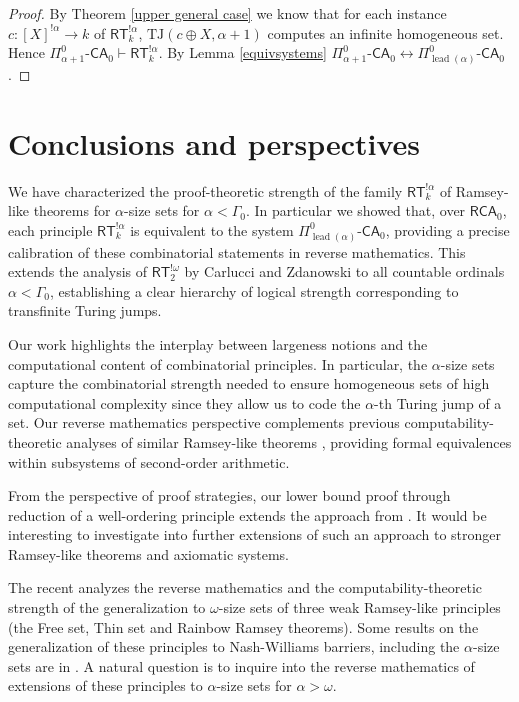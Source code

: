 \documentclass[11pt]{amsart}
\theoremstyle{definition}
\theoremstyle{remark}
\theoremstyle{plain}
\def\a{\alpha}
\newcommand{\RCA}{\mathsf{RCA}_0}
\newcommand{\RT}{\mathsf{RT}}
\newcommand{\TJ}{\mathsf{TJ}}
\newcommand{\lead}{\operatorname{lead}}
\newcommand{\CA}{\mathsf{\text{-}CA}_0}
\def\TJ{{\textrm{TJ}}}
\newcommand{\andrea}[1]{\textcolor{green}{#1}}
\begin{document}
\begin{proof}
By Theorem \ref{upper general case} we know that for each instance $c \colon [X]^{! \alpha} \to k$ of $\RT^{! \alpha}_k$, $\TJ(c \oplus X, \a+1)$ computes an infinite homogeneous set.
Hence $\Pi^0_{\alpha + 1} \CA \vdash \RT^{! \alpha}_k$.
By Lemma \ref{equivsystems} $\Pi^0_{\alpha + 1} \CA \leftrightarrow \Pi^0_{\lead(\alpha)} \CA$.
\end{proof}




\section{Conclusions and perspectives}


We have characterized the proof-theoretic strength of the family $\RT^{!\alpha}_k$ of Ramsey-like theorems for $\alpha$-size sets for $\alpha < \Gamma_0$. 
In particular we showed that, over $\RCA$, each principle $\RT^{!\alpha}_k$ is equivalent to the system $\Pi^0_{\lead(\alpha)} \CA$, providing a precise calibration of these combinatorial statements in reverse mathematics. 
This extends the analysis of $\RT^{!\omega}_2$ by Carlucci and Zdanowski \cite{carlucci2014} to all countable ordinals $\alpha<\Gamma_0$, establishing a clear hierarchy of logical strength corresponding to transfinite Turing jumps.

Our work highlights the interplay between largeness notions and the computational content of combinatorial principles. 
In particular, the $\alpha$-size sets capture the combinatorial strength needed to ensure homogeneous sets of high computational complexity since they allow us to code the $\alpha$-th Turing jump of a set.
Our reverse mathematics perspective complements previous computability-theoretic analyses of similar Ramsey-like theorems \cite{clote1984recursion}, providing formal equivalences within subsystems of second-order arithmetic.

From the perspective of proof strategies, our lower bound proof through reduction of a well-ordering principle extends the approach from \cite{carlucci_zdanowski_2012, carlucci2025}. 
It would be interesting to investigate into further extensions of such an approach to stronger Ramsey-like theorems and axiomatic systems. 

\begin{sloppypar}
The recent \cite{carlucci2024} analyzes the reverse mathematics and the computability-theoretic strength of the generalization to $\omega$-size sets of three weak Ramsey-like principles (the Free set, Thin set and Rainbow Ramsey theorems). 
Some results on the generalization of these principles to Nash-Williams barriers, including the $\alpha$-size sets are in \cite{carlucci_gjetaj_26}. A natural question is to inquire into the reverse mathematics of extensions of these principles to $\a$-size sets for $\a>\omega$.
\end{sloppypar}
\end{document}
